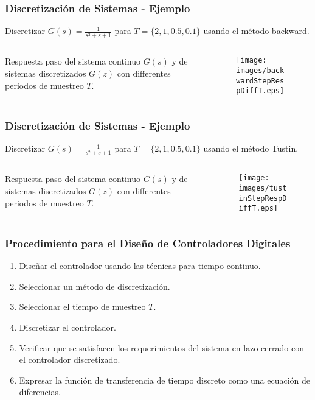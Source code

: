 \documentclass[aspectratio=169,handout]{beamer}
\theoremstyle{definition}
\theoremstyle{plain}
\theoremstyle{remark}
\begin{document}
\begin{frame}[c]\frametitle{Discretización de Sistemas - Ejemplo}
	\vspace*{3mm}	
	Discretizar $G(s) = \frac{1}{s^2 + s + 1}$ para $T = \{2,1,0.5,0.1\}$ usando el método backward.\\
	\begin{columns}
		\begin{column}{0.3\textwidth}
			Respuesta paso del sistema continuo $G(s)$ y de sistemas discretizados $G(z)$ con differentes periodos de muestreo $T$.
		\end{column}
		\begin{column}{0.7\textwidth}
			\begin{figure}
				\centering
				\texttt{[image: images/backwardStepRespDiffT.eps]}
			\end{figure}
		\end{column}
	\end{columns}
\end{frame}

\begin{frame}[c]\frametitle{Discretización de Sistemas - Ejemplo}
	\vspace*{3mm}	
	Discretizar $G(s) = \frac{1}{s^2 + s + 1}$ para $T = \{2,1,0.5,0.1\}$ usando el método Tustin.\\
	\begin{columns}
		\begin{column}{0.3\textwidth}			
			Respuesta paso del sistema continuo $G(s)$ y de sistemas discretizados $G(z)$ con differentes periodos de muestreo $T$.
		\end{column}
		\begin{column}{0.7\textwidth}
			\begin{figure}
				\centering
				\texttt{[image: images/tustinStepRespDiffT.eps]}
			\end{figure}
		\end{column}
	\end{columns}
\end{frame}

\begin{frame}[<+->]\frametitle{Procedimiento para el Diseño de Controladores Digitales}
	\begin{enumerate}
		\item Diseñar el controlador usando las técnicas para tiempo continuo.
		\item Seleccionar un método de discretización.
		\item Seleccionar el tiempo de muestreo $T$.
		\item Discretizar el controlador.
		\item Verificar que se satisfacen los requerimientos del sistema en lazo cerrado con el controlador discretizado.
		\item Expresar la función de transferencia de tiempo discreto como una ecuación de diferencias.
	\end{enumerate}
\end{frame}
\end{document}
